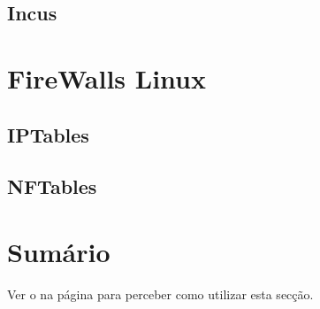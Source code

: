 \subsection{Incus}

\section{FireWalls Linux}

\subsection{IPTables}

\subsection{NFTables}

\section*{Sumário}

Ver o  na página \pageref{sec:intro_summary} para perceber como utilizar esta secção.
